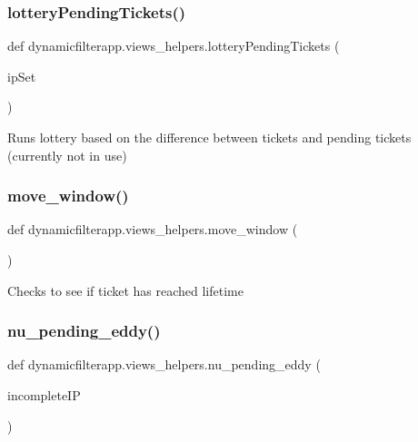 \subsubsection{\texorpdfstring{lottery\+Pending\+Tickets()}{lotteryPendingTickets()}}
{\footnotesize\ttfamily def dynamicfilterapp.\+views\+\_\+helpers.\+lottery\+Pending\+Tickets (\begin{DoxyParamCaption}\item[{}]{ip\+Set }\end{DoxyParamCaption})}

\begin{DoxyVerb}Runs lottery based on the difference between tickets and pending tickets
(currently not in use)
\end{DoxyVerb}
 \mbox{\label{namespacedynamicfilterapp_1_1views__helpers_aa0f3d2407bfd2bfc1074a0fb2f82a336}} 
\subsubsection{\texorpdfstring{move\+\_\+window()}{move\_window()}}
{\footnotesize\ttfamily def dynamicfilterapp.\+views\+\_\+helpers.\+move\+\_\+window (\begin{DoxyParamCaption}{ }\end{DoxyParamCaption})}

\begin{DoxyVerb}Checks to see if ticket has reached lifetime
\end{DoxyVerb}
 \mbox{\label{namespacedynamicfilterapp_1_1views__helpers_ad0e707d8ab5c6b57d4307a9b780a599d}} 
\subsubsection{\texorpdfstring{nu\+\_\+pending\+\_\+eddy()}{nu\_pending\_eddy()}}
{\footnotesize\ttfamily def dynamicfilterapp.\+views\+\_\+helpers.\+nu\+\_\+pending\+\_\+eddy (\begin{DoxyParamCaption}\item[{}]{incomplete\+IP }\end{DoxyParamCaption})}

